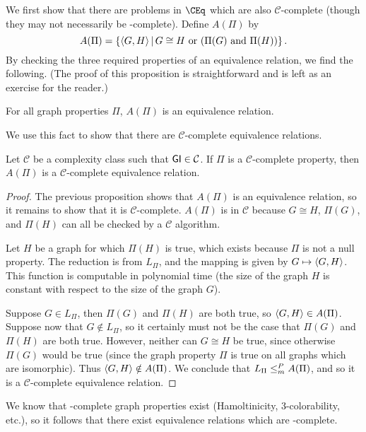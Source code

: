 We first show that there are problems in $\CEq$ which are also $\mathcal{C}$-complete (though they may not necessarily be \CEq-complete).
Define $A(\Pi)$ by
\begin{displaymath}
  A(\Pi) = \left\{ \langle G,H\rangle\,\middle|\, G\cong H \text{ or } (\Pi(G) \text{ and } \Pi(H))\right\}.
\end{displaymath}
By checking the three required properties of an equivalence relation, we find the following.
(The proof of this proposition is straightforward and is left as an exercise for the reader.)
\begin{proposition}
  For all graph properties $\Pi$, $A(\Pi)$ is an equivalence relation.
\end{proposition}
We use this fact to show that there are $\mathcal{C}$-complete equivalence relations.
\begin{proposition}\label{prop:APi}
  Let $\mathcal{C}$ be a complexity class such that ${\mathsf{GI}}\in\mathcal{C}$.
  If $\Pi$ is a $\mathcal{C}$-complete property, then $A(\Pi)$ is a $\mathcal{C}$-complete equivalence relation.
\end{proposition}
\begin{proof}
  The previous proposition shows that $A(\Pi)$ is an equivalence relation, so it remains to show that it is $\mathcal{C}$-complete.
  $A(\Pi)$ is in $\mathcal{C}$ because $G\cong H$, $\Pi(G)$, and $\Pi(H)$ can all be checked by a $\mathcal{C}$ algorithm.

  Let $H$ be a graph for which $\Pi(H)$ is true, which exists because $\Pi$ is not a null property.
  The reduction is from $L_\Pi$, and the mapping is given by $G\mapsto\langle G,H\rangle$.
  This function is computable in polynomial time (the size of the graph $H$ is constant with respect to the size of the graph $G$).

  Suppose $G\in L_\Pi$, then $\Pi(G)$ and $\Pi(H)$ are both true, so $\langle G,H\rangle\in A(\Pi)$.
  Suppose now that $G\notin L_\Pi$, so it certainly must not be the case that $\Pi(G)$ and $\Pi(H)$ are both true.
  However, neither can $G\cong H$ be true, since otherwise $\Pi(G)$ would be true (since the graph property $\Pi$ is true on all graphs which are isomorphic).
  Thus $\langle G,H\rangle\notin A(\Pi)$.
  We conclude that $L_\Pi\leq^{P}_{m} A(\Pi)$, and so it is a $\mathcal{C}$-complete equivalence relation.
\end{proof}

We know that \NP-complete graph properties exist (Hamoltinicity, 3-colorability, etc.), so it follows that there exist equivalence relations which are \NP-complete.

